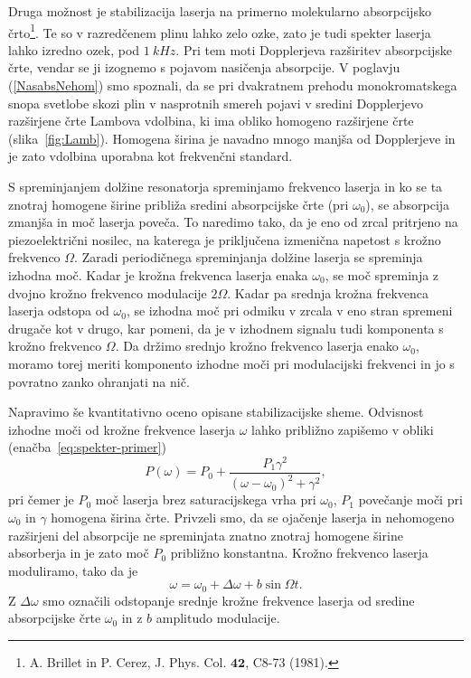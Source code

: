 Druga možnost je stabilizacija laserja na primerno molekularno absorpcijsko
črto\footnote{A. Brillet in P. Cerez, J. Phys. Col. $\mathbf{42}$, C8-73 (1981).}.
Te so v razredčenem plinu lahko zelo ozke, zato je tudi spekter 
laserja lahko izredno ozek, pod $1~\si{kHz}$. 
Pri tem moti Dopplerjeva razširitev absorpcijske črte, vendar se ji
izognemo s pojavom nasičenja 
absorpcije. V poglavju
(\ref{NasabsNehom}) smo spoznali, da se pri dvakratnem prehodu
monokromatskega snopa svetlobe skozi plin v nasprotnih smereh pojavi v
sredini Dopplerjevo razširjene črte Lambova vdolbina, ki 
ima obliko homogeno razširjene črte (slika~\ref{fig:Lamb}). 
Homogena širina je navadno mnogo manjša od Dopplerjeve in
je zato vdolbina uporabna kot frekvenčni standard. 

S spreminjanjem dolžine resonatorja spreminjamo frekvenco laserja in 
ko se ta znotraj homogene širine približa sredini absorpcijske črte (pri $\omega_0$), 
se absorpcija zmanjša in moč laserja poveča. To naredimo tako, da je 
eno od zrcal pritrjeno na piezoelektrični nosilec, na katerega je priključena
izmenična napetost s krožno frekvenco $\Omega$. Zaradi periodičnega spreminjanja dolžine
laserja se spreminja izhodna moč. Kadar je krožna frekvenca laserja 
enaka $\omega_0$, se moč spreminja z dvojno krožno frekvenco modulacije $2\Omega$. 
Kadar pa srednja krožna frekvenca laserja odstopa od $\omega_0$, se izhodna moč 
pri odmiku v zrcala v eno stran spremeni drugače kot v drugo, kar pomeni, 
da je v izhodnem signalu tudi komponenta s krožno frekvenco $\Omega$. Da držimo 
srednjo krožno frekvenco laserja enako $\omega_0$, moramo torej meriti komponento 
izhodne moči pri modulacijski frekvenci in jo s povratno zanko ohranjati na nič.

Napravimo še kvantitativno oceno opisane stabilizacijske sheme. Odvisnost
izhodne moči od krožne frekvence laserja $\omega$ lahko približno zapišemo v
obliki (enačba~\ref{eq:spekter-primer})
\begin{equation}  
\label{5.40}
P(\omega)=P_0 + \frac{P_1\gamma^2}{(\omega- \omega_0)^2+\gamma^2},
\end{equation}
pri čemer je $P_0$ moč laserja brez saturacijskega vrha pri $\omega_0$, $P_1$ 
povečanje moči pri $\omega_0$ in $\gamma$ homogena širina črte. Privzeli  
smo, da se ojačenje laserja in nehomogeno razširjeni del absorpcije ne 
spreminjata znatno znotraj homogene širine absorberja in je zato moč $P_0$ 
približno konstantna. Krožno frekvenco laserja moduliramo, tako da je 
\begin{equation}  
\label{5.41}
\omega=\omega_0+\Delta\omega+b \sin \Omega t.
\end{equation}
Z $\Delta\omega$ smo označili odstopanje srednje krožne frekvence laserja od
sredine absorpcijske črte $\omega_0$ in z $b$ amplitudo modulacije. 

